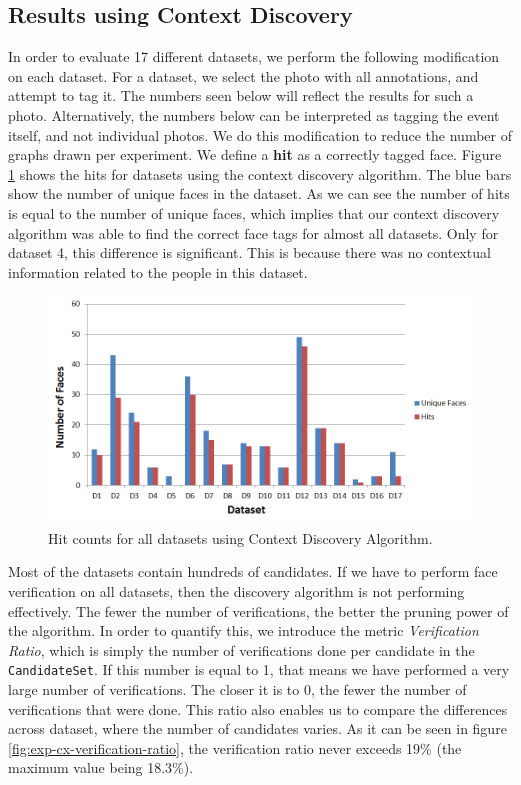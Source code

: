 \subsection{Results using Context Discovery}
In order to evaluate 17 different datasets, we perform the following modification on each dataset. For a dataset, we select the photo with all annotations, and attempt to tag it. The numbers seen below will reflect the results for such a photo. Alternatively, the numbers below can be interpreted as tagging the event itself, and not individual photos. We do this modification to reduce the number of graphs drawn per experiment. We define a \textbf{hit} as a correctly tagged face. Figure \ref{fig:exp-cx-hits} shows the hits for datasets using the context discovery algorithm. The blue bars show the number of unique faces in the dataset. As we can see the number of hits is equal to the number of unique faces, which implies that our context discovery algorithm was able to find the correct face tags for almost all datasets. Only for dataset 4, this difference is significant. This is because there was no contextual information related to the people in this dataset.

\begin{figure}[t]
\centering
\includegraphics[width=\textwidth]{media/chapter5/axis/cx-unique-faces-hits-all-datasets.png}
\caption{Hit counts for all datasets using Context Discovery Algorithm.}
\label{fig:exp-cx-hits}
\end{figure}

Most of the datasets contain hundreds of candidates. If we have to perform face verification on all datasets, then the discovery algorithm is not performing effectively. The fewer the number of verifications, the better the pruning power of the algorithm. In order to quantify this, we introduce the metric \textit{Verification Ratio}, which is simply the number of verifications done per candidate in the \texttt{CandidateSet}. If this number is equal to 1, that means we have performed a very large number of verifications. The closer it is to 0, the fewer the number of verifications that were done. This ratio also enables us to compare the differences across dataset, where the number of candidates varies. As it can be seen in figure \ref{fig:exp-cx-verification-ratio}, the verification ratio never exceeds 19\% (the maximum value being 18.3\%).

